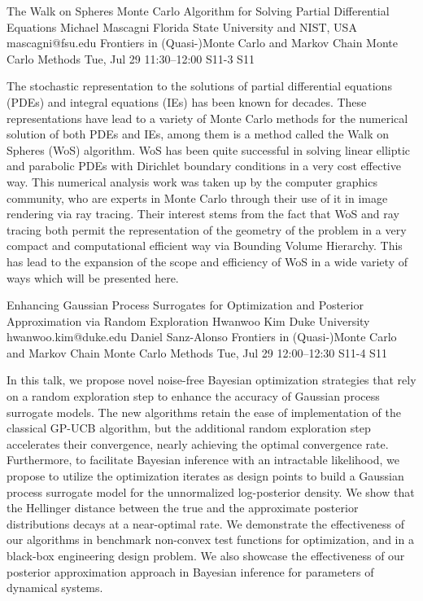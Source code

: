 \begin{talk}
  {The Walk on Spheres Monte Carlo Algorithm for Solving Partial Differential Equations}%
  {Michael Mascagni}%
  {Florida State University and NIST, USA}%
  {mascagni@fsu.edu}%
  {Frontiers in (Quasi-)Monte Carlo and Markov Chain Monte Carlo Methods}%
  {}%
  {Tue, Jul 29 11:30–12:00}%
  {S11-3}%
  {S11}%
				
			
The stochastic representation to the solutions of partial differential equations (PDEs) and integral equations (IEs) has been known for decades.  These representations have lead to a variety of Monte Carlo methods for the numerical solution of both PDEs and IEs, among them is a method called the Walk on Spheres (WoS) algorithm.  WoS has been quite successful in solving linear elliptic and parabolic PDEs with Dirichlet boundary conditions in a very cost effective way.  This numerical analysis work was taken up by the computer graphics community, who are experts in Monte Carlo through their use of it in image rendering via ray tracing.  Their interest stems from the fact that WoS and ray tracing both permit the representation of the geometry of the problem in a very compact and computational efficient way via Bounding Volume Hierarchy.  This has lead to the expansion of the scope and efficiency of WoS in a wide variety of ways which will be presented here.
\end{talk}

\begin{talk}
  {Enhancing Gaussian Process Surrogates for Optimization and Posterior Approximation via Random Exploration}%
  {Hwanwoo Kim}%
  {Duke University}%
  {hwanwoo.kim@duke.edu}%
  {Daniel Sanz-Alonso}%
  {Frontiers in (Quasi-)Monte Carlo and Markov Chain Monte Carlo Methods}%
  {Tue, Jul 29 12:00–12:30}%
  {S11-4}%
  {S11}%
				
			
In this talk, we propose novel noise-free Bayesian optimization strategies that rely on a random exploration step to enhance the accuracy of Gaussian process surrogate models. The new algorithms retain the ease of implementation of the classical GP-UCB algorithm, but the additional random exploration step accelerates their convergence, nearly achieving the optimal convergence rate. Furthermore, to facilitate Bayesian inference with an intractable likelihood, we propose to utilize the optimization iterates as design points to build a Gaussian process surrogate model for the unnormalized log-posterior density. We show that the Hellinger distance between the true and the approximate posterior distributions decays at a near-optimal rate. We demonstrate the effectiveness of our algorithms in benchmark non-convex test functions for optimization, and in a black-box engineering design problem. We also showcase the effectiveness of our posterior approximation approach in Bayesian inference for parameters of dynamical systems.


\end{talk}

